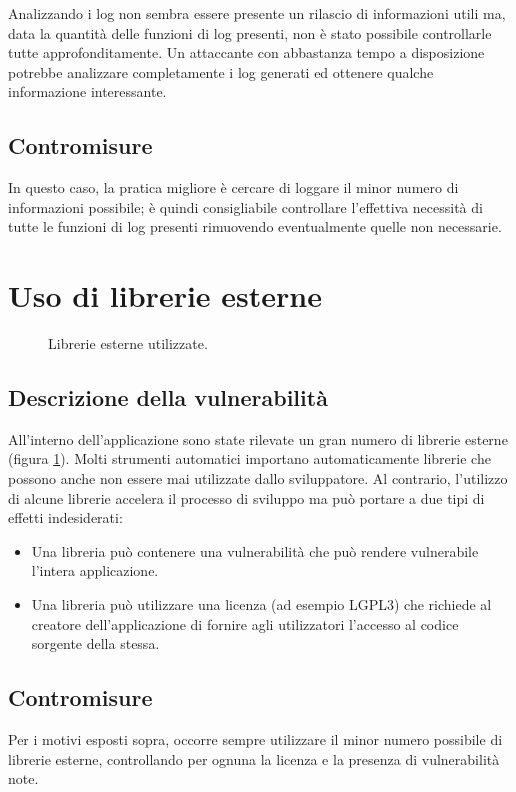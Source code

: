 Analizzando i log non sembra essere presente un rilascio di informazioni utili ma, data la quantità delle funzioni di log presenti, non è stato possibile controllarle tutte approfonditamente. Un attaccante con abbastanza tempo a disposizione potrebbe analizzare completamente i log generati ed ottenere qualche informazione interessante.

\subsection{Contromisure}
In questo caso, la pratica migliore è cercare di loggare il minor numero di informazioni possibile; è quindi consigliabile controllare l'effettiva necessità di tutte le funzioni di log presenti rimuovendo eventualmente quelle non necessarie.

\section{Uso di librerie esterne}

\begin{figure}[h]
	\centering 
	\caption{Librerie esterne utilizzate.}
	\label{fig:librerie}
\end{figure}

\subsection{Descrizione della vulnerabilità}

All'interno dell'applicazione sono state rilevate un gran numero di librerie esterne (figura \ref{fig:librerie}). Molti strumenti automatici importano automaticamente librerie che possono anche non essere mai utilizzate dallo sviluppatore. Al contrario, l'utilizzo di alcune librerie accelera il processo di sviluppo ma può portare a due tipi di effetti indesiderati:

\begin{itemize}
	\item Una libreria può contenere una vulnerabilità che può rendere vulnerabile l'intera applicazione.
	\item Una libreria può utilizzare una licenza (ad esempio LGPL$3$) che richiede al creatore dell'applicazione di fornire agli utilizzatori l'accesso al codice sorgente della stessa.
\end{itemize}

\subsection{Contromisure}
Per i motivi esposti sopra, occorre sempre utilizzare il minor numero possibile di librerie esterne, controllando per ognuna la licenza e la presenza di vulnerabilità note.

